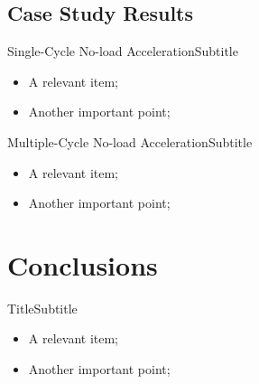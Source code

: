 \subsection{Case Study Results}

    \begin{frame}{Single-Cycle No-load Acceleration}{Subtitle}\vspace*{-2em}
        \begin{itemize}
            \item<2->  A \alert{relevant} item;
            \item<3->  Another \alert{important} point;
        \end{itemize}
    \end{frame}

    \begin{frame}{Multiple-Cycle No-load Acceleration}{Subtitle}\vspace*{-2em}
        \begin{itemize}
            \item<2->  A \alert{relevant} item;
            \item<3->  Another \alert{important} point;
        \end{itemize}
    \end{frame}

\section{Conclusions}

    \begin{frame}{Title}{Subtitle}\vspace*{-2em}
        \begin{itemize}
            \item<2->  A \alert{relevant} item;
            \item<3->  Another \alert{important} point;
        \end{itemize}
    \end{frame}


